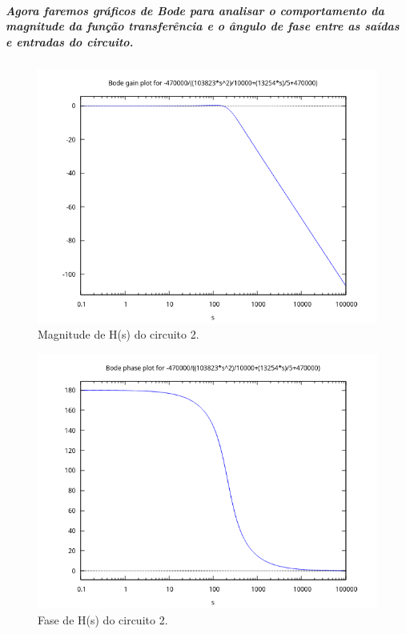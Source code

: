 \documentclass[12pt,twoside, a4paper, twocolumn]{article}
\begin{document}
\subparagraph*{Agora faremos gráficos de Bode para analisar o comportamento da magnitude da função transferência e o ângulo de fase entre as saídas e entradas do circuito.}


\subparagraph*{}


\begin{figure}[h]
    \centering
    \includegraphics[width=1\columnwidth]{images/H2bodegain.png}
    \caption{Magnitude de H(s) do circuito 2.}
\end{figure}


\begin{figure}[h]
    \centering
    \includegraphics[width=1\columnwidth]{images/H2bodephase.png}
    \caption{Fase de H(s) do circuito 2.}
\end{figure}
\end{document}
